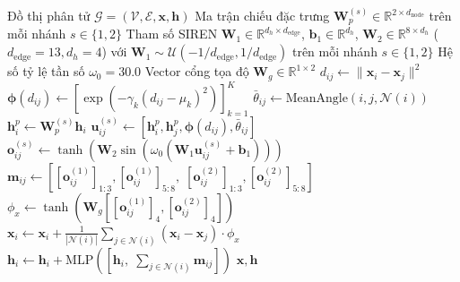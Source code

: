\documentclass[10pt,twocolumn,letterpaper]{article}
\begin{document}
\begin{algorithm}[t]
\caption{Lan truyền Xuôi PRISM (Tầng Đơn lẻ)}
\label{alg:prism}
\begin{algorithmic}[1]
\REQUIRE Đồ thị phân tử $\mathcal{G} = (\mathcal{V}, \mathcal{E}, \mathbf{x}, \mathbf{h})$
\REQUIRE Ma trận chiếu đặc trưng $\mathbf{W}_p^{(s)} \in \mathbb{R}^{2 \times d_{\mathrm{node}}}$ trên mỗi nhánh $s \in \{1,2\}$
\REQUIRE Tham số SIREN $\mathbf{W}_1 \in \mathbb{R}^{d_h \times d_{\mathrm{edge}}}$, $\mathbf{b}_1 \in \mathbb{R}^{d_h}$, $\mathbf{W}_2 \in \mathbb{R}^{8 \times d_h}$ ($d_{\mathrm{edge}} = 13, d_h = 4$) với $\mathbf{W}_1 \sim \mathcal{U}(-1/d_{\mathrm{edge}}, 1/d_{\mathrm{edge}})$ trên mỗi nhánh $s \in \{1,2\}$
\REQUIRE Hệ số tỷ lệ tần số $\omega_0 = 30.0$
\REQUIRE Vector cổng tọa độ $\mathbf{W}_g \in \mathbb{R}^{1 \times 2}$
    \STATE $d_{ij} \leftarrow \|\mathbf{x}_i - \mathbf{x}_j\|^2$ 
    \STATE $\boldsymbol{\phi}(d_{ij}) \leftarrow [\exp(-\gamma_k(d_{ij} - \mu_k)^2)]_{k=1}^K$ 
    \STATE $\bar{\theta}_{ij} \leftarrow \text{MeanAngle}(i, j, \mathcal{N}(i))$ 
        \STATE $\mathbf{h}_i^{p} \leftarrow \mathbf{W}_p^{(s)} \mathbf{h}_i$ 
        \STATE $\mathbf{u}_{ij}^{(s)} \leftarrow [\mathbf{h}_i^p, \mathbf{h}_j^p, \boldsymbol{\phi}(d_{ij}), \bar{\theta}_{ij}]$ 
        \STATE $\mathbf{o}_{ij}^{(s)} \leftarrow \tanh(\mathbf{W}_2 \sin(\omega_0(\mathbf{W}_1 \mathbf{u}_{ij}^{(s)} + \mathbf{b}_1)))$ \label{alg:prism_edge} 
    \ENDFOR
    \STATE $\mathbf{m}_{ij} \leftarrow [[\mathbf{o}_{ij}^{(1)}]_{1:3}, [\mathbf{o}_{ij}^{(1)}]_{5:8},\; [\mathbf{o}_{ij}^{(2)}]_{1:3}, [\mathbf{o}_{ij}^{(2)}]_{5:8}]$ 
    \STATE $\phi_x \leftarrow \tanh(\mathbf{W}_g [[\mathbf{o}_{ij}^{(1)}]_4, [\mathbf{o}_{ij}^{(2)}]_4])$ 
\ENDFOR
{}
    \STATE $\mathbf{x}_i \leftarrow \mathbf{x}_i + \frac{1}{|\mathcal{N}(i)|}\sum_{j \in \mathcal{N}(i)} (\mathbf{x}_i - \mathbf{x}_j) \cdot \phi_x$
    \STATE $\mathbf{h}_i \leftarrow \mathbf{h}_i + \text{MLP}([\mathbf{h}_i,\; \sum_{j \in \mathcal{N}(i)} \mathbf{m}_{ij}])$
\ENDFOR
\RETURN $\mathbf{x}, \mathbf{h}$
\end{algorithmic}
\end{algorithm}
\end{document}
